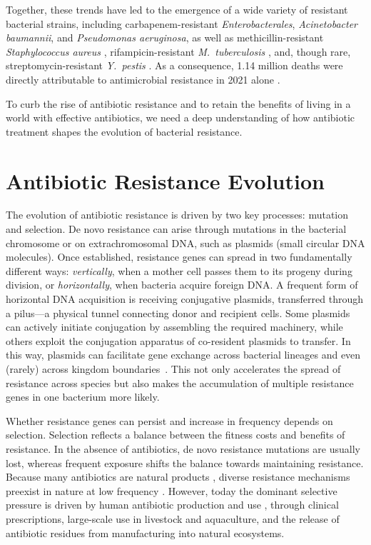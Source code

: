 \documentclass[../main.tex]{subfiles}
\begin{document}
Together, these trends have led to the emergence of a wide variety of resistant bacterial strains, including carbapenem-resistant \textit{Enterobacterales}, \textit{Acinetobacter baumannii}, and \textit{Pseudomonas aeruginosa}, as well as methicillin-resistant \textit{Staphylococcus aureus} \cite{World_Health_Organization2024}, rifampicin-resistant \textit{M.~tuberculosis} \cite{WHO_TB_Report_2025}, and, though rare, streptomycin-resistant \textit{Y.~pestis} \cite{Andrianaivoarimanana2022}.
As a consequence, 1.14 million deaths were directly attributable to antimicrobial resistance in 2021 alone \cite{Naghavi2024}.

To curb the rise of antibiotic resistance and to retain the benefits of living in a world with effective antibiotics, we need a deep understanding of how antibiotic treatment shapes the evolution of bacterial resistance.

\section{Antibiotic Resistance Evolution}
The evolution of antibiotic resistance is driven by two key processes: mutation and selection.
De novo resistance can arise through  mutations in the bacterial chromosome or on extrachromosomal DNA, such as plasmids (small circular DNA molecules).
Once established,  resistance genes can spread in two fundamentally different ways: \emph{vertically}, when a mother cell passes them to its progeny during division, or \emph{horizontally}, when bacteria acquire foreign DNA.
A frequent form of horizontal DNA acquisition is receiving conjugative plasmids, transferred through a pilus---a physical tunnel connecting donor and recipient cells.
Some plasmids can actively initiate conjugation by assembling the required machinery, while others exploit the conjugation apparatus of co-resident plasmids to transfer.
In this way, plasmids can facilitate gene exchange across bacterial lineages and even (rarely) across kingdom boundaries~\cite{Bates1998}.
This not only accelerates the spread of resistance across species but also makes the accumulation of multiple resistance genes in one bacterium more likely.

Whether resistance genes can persist and increase in frequency depends on selection.
Selection reflects a balance between the fitness costs and benefits of resistance.
In the absence of antibiotics, de novo resistance mutations are usually lost, whereas frequent exposure shifts the balance towards maintaining resistance.
Because many antibiotics are natural products \cite{Allen2010}, diverse resistance mechanisms preexist in nature at low frequency \cite{Davies2010}.
However, today the dominant selective pressure is driven by human antibiotic production and use \cite{Bell2014, Rahman2023}, through clinical prescriptions, large-scale use in livestock and aquaculture, and the release of antibiotic residues from manufacturing into natural ecosystems.
\end{document}
